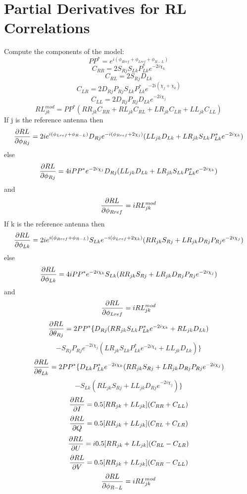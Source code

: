 \section{Partial Derivatives for RL Correlations}
Compute the components of the model:
$$PP^* = e^{i(\phi_{Rref} + \phi_{Lref} + \phi_{R-L})} $$
$$C_{RR} =  2{S_{Rj}}  {S_{Lk}} P^*_{Lk}  e^{-2i\chi_k} $$
$$C_{RL} =  2{S_{Rj}} D_{Lk} $$
$$C_{LR} =  2{D_{Rj}} {P_{Rj}}
   S_{Lk} P^*_{Lk}  e^{-2i(\chi_j + \chi_k)}$$
$$C_{LL} =  2{D_{Rj}} {P_{Rj}}
   {D_{Lk}}  e^{-2i\chi_j} $$
$$ RL^{mod}_{jk} = PP^* (RR_{jk} C_{RR} + RL_{jk} C_{RL} +
   LR_{jk} C_{LR} + LL_{jk} C_{LL}) $$
If j is the reference antenna then
$${\partial RL \over{\partial \phi_{Rj}}} =
   2i {e^{i(\phi_{Lref} + \phi_{R-L})}}
    D_{Rj} {e^{-i(\phi_{Rref} + 2\chi_j)}}
   (LL_{jk}  {D_{Lk}} + LR_{jk}  S_{Lk} P^*_{Lk} e^{-2i\chi_k})$$
else
$${\partial RL \over{\partial \phi_{Rj}}} =
   4i PP^* e^{-2i\chi_j} D_{Rj} (LL_{jk}  {D_{Lk}} + LR_{jk}
    S_{Lk} P^*_{Lk} e^{-2i\chi_k})$$
and
$${\partial RL \over{\partial \phi_{Rref}}} = i RL^{mod}_{jk}$$
If k is the reference antenna then
$${\partial RL \over{\partial \phi_{Lk}}} =
   2i e^{i(\phi_{Rref} + \phi_{R-L})}
    S_{Lk} e^{-i(\phi_{Lref} + 2\chi_k)}
   (RR_{jk}  {S_{Rj}} + LR_{jk}{D_{Rj}} {P_{Rj}} e^{-2i\chi_j}) $$
else
$${\partial RL \over{\partial \phi_{Lk}}} =
   4i PP^* e^{-2i\chi_k} S_{Lk}
  (RR_{jk}  {S_{Rj}} + LR_{jk}
  {D_{Rj}} {P_{Rj}} e^{-2i\chi_j})$$
and
$${\partial RL \over{\partial \phi_{Lref}}} = i RL^{mod}_{jk}$$
$${\partial RL \over{\partial \theta_{Rj}}} =
    2PP^* \{D_{Rj} (RR_{jk} S_{Lk} P^*_{Lk} e^{-2i\chi_k} +
   RL_{jk}  {D_{Lk}}) $$
   $$- S_{Rj} P_{Rj} e^{-2i\chi_j} (LR_{jk}
   S_{Lk} P^*_{Lk} e^{-2i\chi_k} + LL_{jk}  {D_{Lk}})\}$$
$${\partial RL \over{\partial \theta_{Lk}}} =
     2PP^* \{D_{Lk} P^*_{Lk} e^{-2i\chi_k} (RR_{jk}  {S_{Rj}}+
   LR_{jk}  {D_{Rj}} {P_{Rj}}  e^{-2i\chi_j})$$
   $$ - S_{Lk} (RL_{jk}  {S_{Rj}}
   + LL_{jk}  {D_{Rj}} e^{-2i\chi_j})\}$$
$${\partial RL \over{\partial I}} =
    0.5[RR_{jk} + LL_{jk}] (C_{RR} + C_{LL})$$
$${\partial RL \over{\partial Q}} =
   0.5[RR_{jk} + LL_{jk}] (C_{RL} + C_{LR}) $$
$${\partial RL \over{\partial U}} =
   i 0.5[RR_{jk} + LL_{jk}] (C_{RL} - C_{LR})$$
$${\partial RL \over{\partial V}} =
   0.5[RR_{jk} + LL_{jk}] (C_{RR} - C_{LL}) $$
$${\partial RL \over{\partial \phi_{R-L}}} = i  RL^{mod}_{jk} $$



